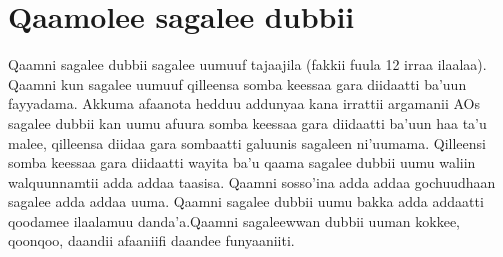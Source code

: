 \documentclass[11pt,b5paper]{book}
\begin{document}
\section{Qaamolee sagalee dubbii}

Qaamni sagalee dubbii sagalee uumuuf tajaajila (fakkii fuula 12 irraa ilaalaa). Qaamni kun sagalee uumuuf qilleensa somba keessaa gara diidaatti ba’uun fayyadama. Akkuma afaanota
hedduu addunyaa kana irrattii argamanii AOs sagalee dubbii kan uumu afuura somba keessaa gara diidaatti ba’uun haa ta’u malee, qilleensa diidaa gara sombaatti galuunis sagaleen
ni’uumama. Qilleensi somba keessaa gara diidaatti wayita ba’u qaama sagalee dubbii uumu waliin walquunnamtii adda addaa taasisa. Qaamni sosso’ina adda addaa gochuudhaan sagalee
adda addaa uuma. Qaamni sagalee dubbii uumu bakka adda addaatti qoodamee ilaalamuu danda’a.Qaamni sagaleewwan dubbii uuman kokkee, qoonqoo, daandii afaaniifi daandee funyaaniiti.
\end{document}
